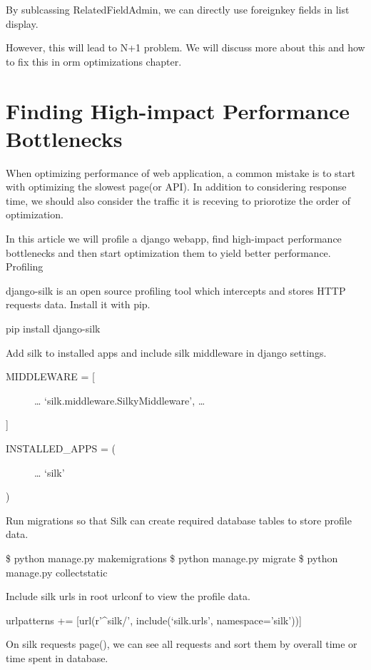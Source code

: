 \documentclass[letterpaper,11pt,english]{sphinxmanual}
\begin{document}
By sublcassing RelatedFieldAdmin, we can directly use foreignkey fields in list display.

However, this will lead to N+1 problem. We will discuss more about this and how to fix this in orm optimizations chapter.


\chapter{Finding High-impact Performance Bottlenecks}
\label{\detokenize{misc_bottlenecks:finding-high-impact-performance-bottlenecks}}\label{\detokenize{misc_bottlenecks::doc}}
When optimizing performance of web application, a common mistake is to start with optimizing the slowest page(or API). In addition to considering response time, we should also consider the traffic it is receving to priorotize the order of optimization.

In this article we will profile a django webapp, find high-impact performance bottlenecks and then start optimization them to yield better performance.
Profiling

django-silk is an open source profiling tool which intercepts and stores HTTP requests data. Install it with pip.

pip install django-silk

Add silk to installed apps and include silk middleware in django settings.
\begin{description}
\item[{MIDDLEWARE = {[}}] \leavevmode
…
‘silk.middleware.SilkyMiddleware’,
…

\end{description}

{]}
\begin{description}
\item[{INSTALLED\_APPS = (}] \leavevmode
…
‘silk’

\end{description}

)

Run migrations so that Silk can create required database tables to store profile data.

\$ python manage.py makemigrations
\$ python manage.py migrate
\$ python manage.py collectstatic

Include silk urls in root urlconf to view the profile data.

urlpatterns += {[}url(r’\textasciicircum{}silk/’, include(‘silk.urls’, namespace=’silk’)){]}

On silk requests page(), we can see all requests and sort them by overall time or time spent in database.
\end{document}
